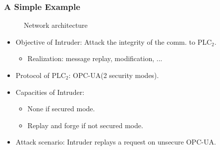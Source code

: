 \documentclass{beamer}
\newcommand{\opcua}{OPC-UA\xspace}
\begin{document}
\begin{frame}
    \frametitle{A Simple Example}

    \vspace{-.7em}
    \begin{figure}[htb]
        \resizebox{.7\textwidth}{!}{
            
        }
        \caption{Network architecture}
    \end{figure}
    \vspace{-1em}
    \begin{itemize}
        \item Objective of {\color{red} Intruder}: Attack the integrity of the comm. to {\color{green!70!black} PLC$_{2}$}.
        \begin{itemize}
            \item Realization: message replay, modification, ...
        \end{itemize}
            \vfill
        \item Protocol of {\color{green!70!black} PLC$_{2}$}: \opcua (2 security modes).
            \vfill
        \item Capacities of {\color{red} Intruder}:
        \begin{itemize}
            \item None if secured mode.
            \item Replay and forge if not secured mode.
        \end{itemize}
            \vfill
        \item Attack scenario: {\color{red} Intruder} replays a request on unsecure \opcua.
    \end{itemize}
\end{frame}
\end{document}

